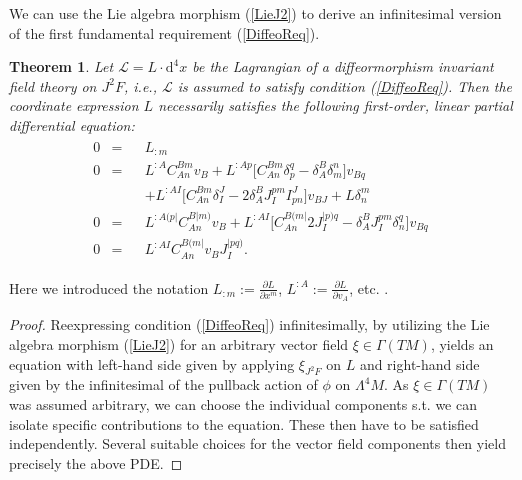 \documentclass[%
 reprint,
nofootinbib,
 amsmath,amssymb,
 aps,
 prd,
floatfix,
]{revtex4-2}
\newtheorem{theorem}{Theorem}
\begin{document}
We can use the Lie algebra morphism (\ref{LieJ2}) to derive an infinitesimal version of the first fundamental requirement (\ref{DiffeoReq}).
\begin{theorem}
Let $\mathcal{L} = L \cdot \mathrm{d}^4x$ be the Lagrangian of a diffeormorphism invariant field theory on $J^2F$, i.e., $\mathcal{L}$ is assumed to satisfy condition (\ref{DiffeoReq}). Then the coordinate expression $L$ necessarily satisfies the following first-order, linear partial differential equation:  
\begin{align}\label{DiffeoEqn}
\begin{aligned}
    0 &= &&L_{:m} \\
    0 &= &&L^{:A} C_{An}^{Bm} v_B + L^{:Ap} \bigl[ C_{An}^{Bm} \delta_p^q - \delta_A^B \delta_m^n \bigr] v_{Bq}\\
    & &&+ L^{:AI} \bigl[ C_{An}^{Bm} \delta_I^J - 2 \delta_A^B J_I^{pm} I^J_{pn}  \bigr] v_{BJ} + L \delta^m_n \\
    0 &= &&L^{:A(p\vert}C_{An}^{B \vert m)} v_B + L^{: AI} \bigl[ C_{An}^{B(m\vert} 2 J_I^{\vert p) q} - \delta^B_A J_I ^{pm} \delta_n^q \bigr] v_{Bq} \\
    0 &= &&L^{:AI} C_{An}^{B(m\vert} v_B J_I^{\vert p q )}.
\end{aligned}
\end{align}
\end{theorem}
Here we introduced the notation $L_{:m} := \frac{\partial L}{\partial x^m}$, $L^{:A} := \frac{\partial L}{ \partial v_A}$, etc. .
\begin{proof}
Reexpressing condition (\ref{DiffeoReq}) infinitesimally, by utilizing the Lie algebra morphism (\ref{LieJ2}) for an arbitrary vector field $\xi \in \Gamma(TM)$, yields an equation with left-hand side given by applying $\xi_{J^2F}$ on $L$ and right-hand side given by the infinitesimal of the pullback action of $\phi$ on $\Lambda^4M$.
As $\xi \in \Gamma(TM)$ was assumed arbitrary, we can choose the individual components s.t. we can isolate specific contributions to the equation. These then have to be satisfied independently. Several suitable choices for the vector field components then yield precisely the above PDE. 
\end{proof}
\end{document}
